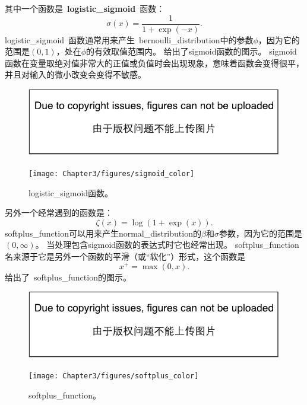 其中一个函数是~\textbf{\gls{logistic_sigmoid}}~函数：
\begin{equation}
\sigma(x) = \frac{1}{1+\exp(-x)}.
\end{equation}
\gls{logistic_sigmoid}~函数通常用来产生~\gls{bernoulli_distribution}中的参数$\phi$，因为它的范围是$(0,1)$，处在$\phi$的有效取值范围内。
给出了sigmoid函数的图示。
sigmoid函数在变量取绝对值非常大的正值或负值时会出现现象，意味着函数会变得很平，并且对输入的微小改变会变得不敏感。
\begin{figure}[!htb]
\ifOpenSource
\centerline{\includegraphics{figure.pdf}}
\else
\centerline{\texttt{[image: Chapter3/figures/sigmoid\_color]}}
\fi
\caption{\gls{logistic_sigmoid}函数。}
\label{fig:chap3_sigmoid_color}
\end{figure}

另外一个经常遇到的函数是\citep{secondorder:2001:nips}：
\begin{equation}
\zeta(x) = \log(1+\exp(x)).
\end{equation}
\gls{softplus_function}可以用来产生\gls{normal_distribution}的$\beta$和$\sigma$参数，因为它的范围是$(0,\infty)$。
当处理包含sigmoid函数的表达式时它也经常出现。
\gls{softplus_function}名来源于它是另外一个函数的平滑（或``软化''）形式，这个函数是
\begin{equation}
x^+ = \max(0, x).
\end{equation}
给出了~\gls{softplus_function}的图示。
\begin{figure}[!htb]
\ifOpenSource
\centerline{\includegraphics{figure.pdf}}
\else
\centerline{\texttt{[image: Chapter3/figures/softplus\_color]}}
\fi
\caption{\gls{softplus_function}。}
\label{fig:chap3_softplus_color}
\end{figure}


